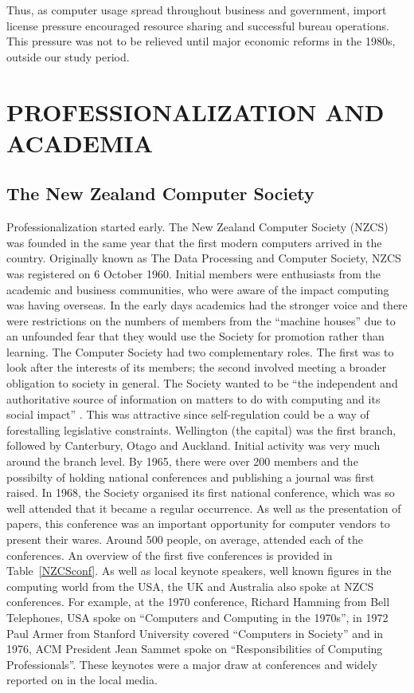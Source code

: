 \documentclass{IEEEcsmag}
\begin{document}
Thus, as computer usage spread throughout business and government, import license pressure encouraged resource sharing and successful bureau operations. This pressure was not to be relieved until major economic reforms in the 1980s, outside our study period.

\vspace*{-8pt}
\section{PROFESSIONALIZATION AND ACADEMIA}

\subsection{The New Zealand Computer Society}
\vspace*{5pt}
Professionalization started early. The New Zealand Computer Society (NZCS) was founded in the same year that the first modern computers arrived in the country.
Originally known as The Data Processing and Computer Society, NZCS was registered on 6 October 1960. Initial members were enthusiasts from the academic and business communities, who were aware of the impact computing was having overseas. In the early days academics had the stronger voice and there were restrictions on the numbers of members from the “machine houses” due to an unfounded fear that they would use the Society for promotion rather than learning. 
The Computer Society had two complementary roles. The first was to look after the interests of its members; the second involved meeting a broader obligation to society in general. The Society wanted to be “the independent and authoritative source of information on matters to do with computing and its social impact” . This was attractive since self-regulation could be a way of forestalling legislative constraints.
Wellington (the capital) was the first branch, followed by Canterbury, Otago and Auckland. Initial activity was very much around the branch level. By 1965, there were over 200 members and the possibilty of holding national conferences and publishing a journal was first raised. 
In 1968, the Society organised its first national conference, which was so well attended that it became a regular occurrence. As well as the presentation of papers, this conference was an important opportunity for computer vendors to present their wares. Around 500 people, on average, attended each of the conferences. An overview of the first five conferences is provided in Table~\ref{NZCSconf}. As well as local keynote speakers, well known figures in the computing world from the USA, the UK and Australia also spoke at NZCS conferences. For example, at the 1970 conference, Richard Hamming from Bell Telephones, USA spoke on “Computers and Computing in the 1970s”, in 1972 Paul Armer from Stanford University covered “Computers in Society” and in 1976, ACM President Jean Sammet spoke on “Responsibilities of Computing Professionals”. These keynotes were a major draw at conferences and widely reported on in the local media.
\end{document}
